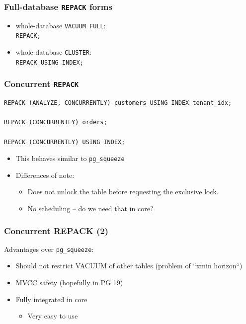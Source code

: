 \begin{frame}
  \frametitle{Full-database \texttt{REPACK} forms}
  \begin{itemize}
    \item whole-database \texttt{VACUUM FULL}: \\
      \texttt{REPACK;}
    \item whole-database \texttt{CLUSTER}: \\
      \texttt{REPACK USING INDEX;}
  \end{itemize}
\end{frame}

\begin{frame}[fragile]
  \frametitle{Concurrent \texttt{REPACK}}
  \begin{lstlisting}
REPACK (ANALYZE, CONCURRENTLY) customers USING INDEX tenant_idx;

REPACK (CONCURRENTLY) orders;

REPACK (CONCURRENTLY) USING INDEX;
  \end{lstlisting}
  \begin{itemize}
    \item This behaves similar to \texttt{pg\_squeeze}
    \item Differences of note:
      \begin{itemize}
	\item Does not unlock the table before requesting the exclusive lock.
	\item No scheduling -- do we need that in core?
      \end{itemize}
  \end{itemize}
\end{frame}

\begin{frame}
  \frametitle{Concurrent REPACK (2)}

  Advantages over \texttt{pg\_squeeze}:

  \begin{itemize}
    \item Should not restrict VACUUM of other tables (problem of ``xmin
      horizon``)
    \item MVCC safety (hopefully in PG 19)
    \item Fully integrated in core
    \begin{itemize} \item Very easy to use \end{itemize}
  \end{itemize}

\end{frame}


